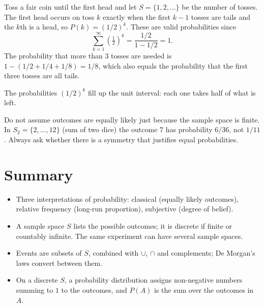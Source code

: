 \begin{example}
Toss a fair coin until the first head and let $S=\{1,2,\dots\}$ be the number of tosses.
The first head occurs on toss $k$ exactly when the first $k-1$ tosses are tails and the
$k$th is a head, so $P(k) = (1/2)^k$. These are valid probabilities since
\[
  \sum_{k=1}^\infty \left(\tfrac12\right)^k = \frac{1/2}{1-1/2} = 1.
\]
The probability that more than $3$ tosses are needed is
$1 - (1/2 + 1/4 + 1/8) = 1/8$, which also equals the probability that the first three
tosses are all tails.
\end{example}

\begin{center}
\end{center}
The probabilities $(1/2)^k$ fill up the unit interval: each one takes half of what is left.

\begin{important}
Do not assume outcomes are equally likely just because the sample space is finite. In
$S_2=\{2,\dots,12\}$ (sum of two dice) the outcome $7$ has probability $6/36$, not
$1/11$. Always ask whether there is a symmetry that justifies equal probabilities.
\end{important}

\section{Summary}

\begin{itemize}
  \item Three interpretations of probability: classical (equally likely outcomes),
        relative frequency (long-run proportion), subjective (degree of belief).
  \item A sample space $S$ lists the possible outcomes; it is discrete if finite or
        countably infinite. The same experiment can have several sample spaces.
  \item Events are subsets of $S$, combined with $\cup$, $\cap$ and complements;
        De Morgan's laws convert between them.
  \item On a discrete $S$, a probability distribution assigns non-negative numbers
        summing to $1$ to the outcomes, and $P(A)$ is the sum over the outcomes in $A$.
\end{itemize}
